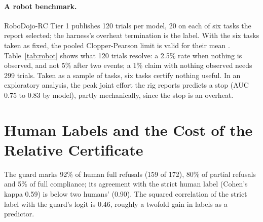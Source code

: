 \paragraph{A robot benchmark.} RoboDojo-RC Tier 1 \citep{machcha2026robodojo} publishes 120 trials per model, 20 on each
of six tasks the report selected; the harness's overheat termination is the label. With the six tasks taken as fixed,
the pooled Clopper-Pearson limit is valid for their mean \citep{hoeffding1956successes}. Table~\ref{tab:robot} shows what
120 trials resolve: a 2.5\% rate when nothing is observed, and not 5\% after two events; a 1\% claim with nothing
observed needs 299 trials. Taken as a sample of tasks, six tasks certify nothing useful. In an exploratory analysis, the
peak joint effort the rig reports predicts a stop (AUC 0.75 to 0.83 by model), partly mechanically, since the stop is an
overheat.

\begin{table}[t]
\centering
\scriptsize
\setlength{\tabcolsep}{2pt}
\resizebox{\ifdim\width>\textwidth\textwidth\else\width\fi}{!}{}
\caption{Safety stops on a robot benchmark, upper bounds; the last column takes the tasks as a sample (betting bound
on six task rates).}
\label{tab:robot}
\end{table}

\section{Human Labels and the Cost of the Relative Certificate}
\label{app:human}

\begin{table}[t]
\centering
\scriptsize
\setlength{\tabcolsep}{3pt}

\caption{The guard's refusal flag against XSTest's human labels on safe prompts: recall and false-alarm rate against full
refusal (strict) and against full or partial refusal (broad). Pooled row: 95\% bootstrap intervals over prompts.}
\label{tab:xstest}
\end{table}

The guard marks 92\% of human full refusals (159 of 172), 80\% of partial refusals and 5\% of full compliance; its
agreement with the strict human label (Cohen's kappa 0.59) is below two humans' (0.90). The squared correlation of the
strict label with the guard's logit is 0.46, roughly a twofold gain in labels as a predictor.

\begin{table}[t]
\centering
\scriptsize

\caption{One annotator's labels of 220 responses (conservative 95\% intervals).}
\label{tab:human}
\end{table}

